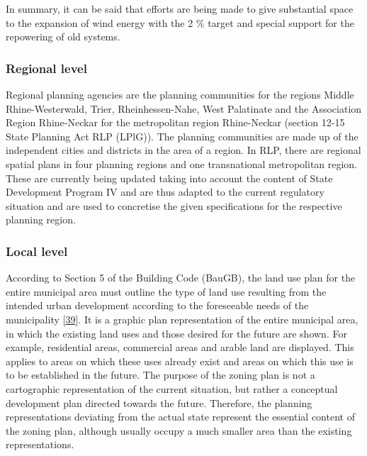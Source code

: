 \documentclass[a4paper,11pt]{article}
\begin{document}
In summary, it can be said that efforts are being made to give substantial space to the expansion of wind energy with the 2 \% target and special support for the repowering of old systems.

\hypertarget{regional-level}{%
\subsubsection{Regional level}\label{regional-level}}

Regional planning agencies are the planning communities for the regions Middle Rhine-Westerwald, Trier, Rheinhessen-Nahe, West Palatinate and the Association Region Rhine-Neckar for the metropolitan region Rhine-Neckar (section 12-15 State Planning Act RLP (LPlG)). The planning communities are made up of the independent cities and districts in the area of a region. In RLP, there are regional spatial plans in four planning regions and one transnational metropolitan region. These are currently being updated taking into account the content of State Development Program IV and are thus adapted to the current regulatory situation and are used to concretise the given specifications for the respective planning region.

\hypertarget{local-level}{%
\subsubsection{Local level}\label{local-level}}

According to Section 5 of the Building Code (BauGB), the land use plan for the entire municipal area must outline the type of land use resulting from the intended urban development according to the foreseeable needs of the municipality {[}\protect\hyperlink{ref-BundesministeriumderJustizundfurVerbraucherschutz.1960}{39}{]}. It is a graphic plan representation of the entire municipal area, in which the existing land uses and those desired for the future are shown. For example, residential areas, commercial areas and arable land are displayed. This applies to areas on which these uses already exist and areas on which this use is to be established in the future. The purpose of the zoning plan is not a cartographic representation of the current situation, but rather a conceptual development plan directed towards the future. Therefore, the planning representations deviating from the actual state represent the essential content of the zoning plan, although usually occupy a much smaller area than the existing representations.
\end{document}
